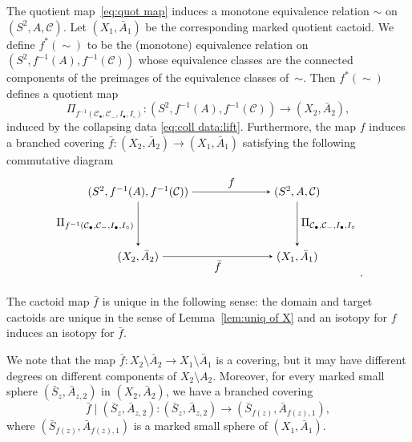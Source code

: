 \documentclass{amsart}
\theoremstyle{plain}
\theoremstyle{definition}
\theoremstyle{remark}
\newcommand{\CC}{{\mathcal C}}
\begin{document}
The quotient map~\eqref{eq:quot map} induces a monotone equivalence relation $\sim$ on $(S^2,A,\CC)$.  Let $(X_1, \bar A_1)$ be the corresponding marked quotient cactoid.  We define $f^*(\sim)$ to be the (monotone) equivalence relation on $(S^2,f^{-1}(A),f^{-1}(\CC))$  whose equivalence classes are the connected components of the preimages of the equivalence classes of~$\sim$. Then $f^*(\sim)$ defines a quotient map
\begin{equation}
\label{eq:X_1 X_2}
\Pi_{f^{-1}(\CC_\bullet, \CC_- , I_\bullet , I_\circ)}  \colon (S^2,f^{-1}(A),f^{-1}(\CC))\to (X_2,\bar A_2),
\end{equation} 
induced by the collapsing data \eqref{eq:coll data:lift}. 
Furthermore, the map $f$ induces a branched covering $\bar f \colon (X_2,\bar A_2)\to (X_1,\bar A_1)$ satisfying the following commutative diagram
\begin{equation}
\label{eq:bar f}
{\begin{tikzpicture}
  \matrix (m) [matrix of math nodes,row sep=4em,column sep=7em,minimum width=2em]
  {
     (S^2,f^{-1}(A),f^{-1}(\CC)) &(S^2,A,\CC) \\
     (X_2,\bar A_2) & (X_1,\bar A_1) \\};
  \path[-stealth]
    (m-1-1) edge node [left] {$\Pi_{f^{-1}(\CC_\bullet, \CC_- , I_\bullet , I_\circ)} $} (m-2-1)
            edge  node [above] {$f$} (m-1-2)
    (m-2-1.east|-m-2-2) edge node [below] {$\bar f$}
          (m-2-2)
    (m-1-2) edge node [right] {$\Pi_{ \CC_\bullet, \CC_- , I_\bullet , I_\circ }$} (m-2-2);
\end{tikzpicture}}.
\end{equation}

The cactoid map $\bar f$ is unique in the following sense: the domain and target cactoids are unique in the sense of Lemma~\ref{lem:uniq of X} and an isotopy for $f$ induces an isotopy for $\bar f$.




We note that the map  $\bar f\colon  X_2\setminus \bar A_2 \to X_1\setminus \bar A_1$ is a covering, but it may have different degrees on different components of $X_2\setminus A_2$. Moreover, for every marked small sphere $(\bar S_z,\bar A_{z,2})$ in $(X_2,\bar A_2)$, we have a branched covering \[\bar f\mid (\bar S_z,\bar A_{z,2})\colon (\bar S_z,\bar A_{z,2})\to (\bar S_{f(z)},\bar A_{f(z),1}),\]
where $ (\bar S_{f(z)},\bar A_{f(z),1})$ is a marked small sphere of $(X_1,\bar A_1)$. 
\end{document}
